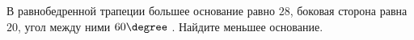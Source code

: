 \begin{ex}
	\begin{condition}
		В равнобедренной трапеции большее основание равно \( 28 \), боковая сторона равна \( 20 \), угол между ними \( 60 \degree\) . Найдите меньшее основание.
	\end{condition}
\end{ex}